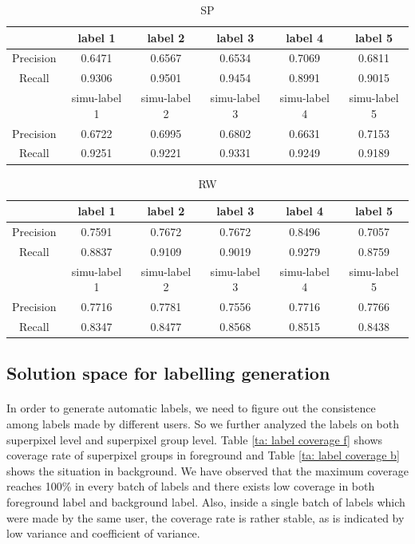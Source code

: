 \documentclass[runningheads,a4paper]{llncs}
\begin{document}
\begin{table}
\centering
\begin{tabular}{|c|c|c|c|c|c|}
\hline
 & label 1 & label 2&label 3&label 4&label 5 \\
\hline
Precision& 0.6471 & 0.6567 & 0.6534& 0.7069& 0.6811 \\
\hline
Recall& 0.9306 & 0.9501 & 0.9454& 0.8991& 0.9015 \\
\hline
 & simu-label 1 & simu-label 2&simu-label 3&simu-label 4&simu-label 5 \\
\hline
Precision& 0.6722 & 0.6995 & 0.6802& 0.6631& 0.7153 \\
\hline
Recall& 0.9251 & 0.9221 & 0.9331& 0.9249& 0.9189 \\
\hline
\end{tabular}
\caption{SP}
\label{ta: simu in sp}
\end{table}


\begin{table}
\centering
\begin{tabular}{|c|c|c|c|c|c|}
\hline
 & label 1 & label 2&label 3&label 4&label 5 \\
\hline
Precision& 0.7591 & 0.7672 & 0.7672& 0.8496& 0.7057 \\
\hline
Recall& 0.8837 & 0.9109 & 0.9019& 0.9279& 0.8759 \\
\hline
 & simu-label 1 & simu-label 2&simu-label 3&simu-label 4&simu-label 5 \\
\hline
Precision& 0.7716 & 0.7781 & 0.7556& 0.7716& 0.7766 \\
\hline
Recall& 0.8347 & 0.8477 & 0.8568& 0.8515& 0.8438 \\
\hline
\end{tabular}
\caption{RW}
\label{ta: simu in rw}
\end{table}


\subsection{Solution space for labelling generation}
\paragraph{} In order to generate automatic labels, we need to figure out the consistence among labels made by different users. So we further analyzed the labels on both superpixel level and superpixel group level. Table \ref{ta: label coverage f} shows coverage rate of superpixel groups in foreground and Table \ref{ta: label coverage b} shows the situation in background.
We have observed that the maximum coverage reaches 100\% in every batch of labels and there exists low coverage in both foreground label and background label. Also, inside a single batch of labels which were made by the same user, the coverage rate is rather stable, as is indicated by low variance and coefficient of variance.
\end{document}
